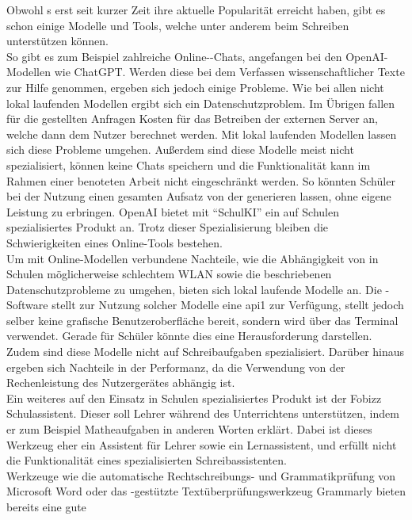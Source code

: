 \documentclass[../main.tex]{subfiles}
\begin{document}
Obwohl s erst seit kurzer Zeit ihre aktuelle Popularität erreicht haben, gibt es schon einige Modelle und Tools, welche unter anderem beim Schreiben unterstützen können. \\
So gibt es zum Beispiel zahlreiche Online--Chats, angefangen bei den OpenAI-Modellen wie ChatGPT. Werden diese bei dem Verfassen wissenschaftlicher Texte zur Hilfe genommen, ergeben 
sich jedoch einige Probleme. Wie bei allen nicht lokal laufenden Modellen ergibt sich ein Datenschutzproblem. Im Übrigen fallen für die gestellten Anfragen Kosten für das Betreiben der 
externen Server an, welche dann dem Nutzer berechnet werden. Mit lokal laufenden Modellen lassen sich diese Probleme umgehen. Außerdem sind diese Modelle meist nicht spezialisiert, 
können keine Chats speichern und die Funktionalität kann im Rahmen einer benoteten Arbeit nicht eingeschränkt werden. So könnten Schüler bei der Nutzung einen gesamten Aufsatz von 
der  generieren lassen, ohne eigene Leistung zu erbringen. OpenAI bietet mit "`SchulKI"' ein auf Schulen spezialisiertes Produkt an. Trotz dieser Spezialisierung bleiben die 
Schwierigkeiten eines Online-Tools bestehen.\cite{schulki}\\ 
Um mit Online-Modellen verbundene Nachteile, wie die Abhängigkeit von in Schulen möglicherweise schlechtem WLAN sowie die beschriebenen Datenschutzprobleme zu umgehen, bieten sich 
lokal laufende Modelle an. Die -Software  stellt zur Nutzung solcher Modelle eine \acrshort{api1} zur Verfügung, stellt jedoch selber keine grafische 
Benutzeroberfläche bereit, sondern wird über das Terminal verwendet. Gerade für Schüler könnte dies eine Herausforderung darstellen. Zudem sind diese Modelle nicht auf Schreibaufgaben 
spezialisiert. Darüber hinaus ergeben sich Nachteile in der Performanz, da die Verwendung von der Rechenleistung des Nutzergerätes abhängig ist.\cite{ollamaSchreibassi}\\
Ein weiteres auf den Einsatz in Schulen spezialisiertes Produkt ist der Fobizz Schulassistent. Dieser soll Lehrer während des Unterrichtens unterstützen, indem er zum Beispiel 
Matheaufgaben in anderen Worten erklärt. Dabei ist dieses Werkzeug eher ein Assistent für Lehrer sowie ein Lernassistent, und erfüllt nicht die Funktionalität eines spezialisierten 
Schreibassistenten.\cite{fobizz}\\ 
Werkzeuge wie die automatische Rechtschreibungs- und Grammatikprüfung von Microsoft Word oder das -gestützte Textüberprüfungswerkzeug Grammarly bieten bereits eine gute 
\end{document}
